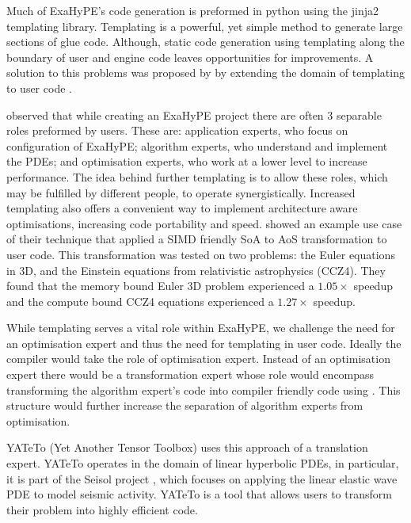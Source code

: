 

Much of ExaHyPE's code generation is preformed in python using the jinja2 templating library.
Templating is a powerful, yet simple method to generate large sections of glue code.
Although, static code generation using templating along the boundary of user and engine code leaves opportunities for improvements.  
A solution to this problems was proposed by \citeauthor{templateExahype} by extending the domain of templating to user code \cite{templateExahype}.

\citeauthor{templateExahype} observed that while creating an ExaHyPE project there are often 3 separable roles preformed by users.
These are: application experts, who focus on configuration of ExaHyPE; algorithm experts, who understand and implement the PDEs; and optimisation experts, who work at a lower level to increase performance.
The idea behind further templating is to allow these roles, which may be fulfilled by different people, to operate synergistically.
Increased templating also offers a convenient way to implement architecture aware optimisations, increasing code portability and speed.
\citeauthor{templateExahype} showed an example use case of their technique that applied a SIMD friendly SoA to AoS transformation to user code.
This transformation was tested on two problems: the Euler equations in 3D, and the Einstein equations from relativistic astrophysics (CCZ4).
They found that the memory bound Euler 3D problem experienced a $1.05\times$ speedup and the compute bound CCZ4 equations experienced a $1.27\times$ speedup.

While templating serves a vital role within ExaHyPE, we challenge the need for an optimisation expert and thus the need for templating in user code.
Ideally the compiler would take the role of optimisation expert.
Instead of an optimisation expert there would be a transformation expert whose role would encompass transforming the algorithm expert's code into compiler friendly code using \phlat.
This structure would further increase the separation of algorithm experts from optimisation.


YATeTo (Yet Another Tensor Toolbox) \cite{YATeTo} uses this approach of a translation expert.
YATeTo operates in the domain of linear hyperbolic PDEs, in particular, it is part of the Seisol project \cite{seisolPFLOP}, which focuses on applying the linear elastic wave PDE to model seismic activity.
YATeTo is a tool that allows users to transform their problem into highly efficient code.   

